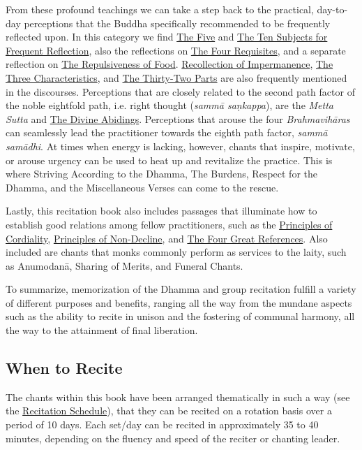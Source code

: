 From these profound teachings we can take a step back to the practical, day-to-day perceptions that the Buddha specifically recommended to be frequently reflected upon. In this category we find \hyperref[five-reflections]{The Five} and \hyperref[ten-reflections]{The Ten Subjects for Frequent Reflection}, also the reflections on \hyperref[four-requisites]{The Four Requisites}, and a separate reflection on \hyperref[repulsiveness-of-food]{The Repulsiveness of Food}. \hyperref[recollection-of-impermanence]{Recollection of Impermanence}, \hyperref[three-characteristics]{The Three Characteristics}, and \hyperref[32-parts]{The Thirty-Two Parts} are also frequently mentioned in the discourses. Perceptions that are closely related to the second path factor of the noble eightfold path, i.e. right thought (\textit{sammā saṇkappa}), are the \textit{Metta Sutta} and \hyperref[divine-abidings]{The Divine Abidings}. Perceptions that arouse the four \textit{Brahmavihāras} can seamlessly lead the practitioner towards the eighth path factor, \textit{sammā samādhi}. At times when energy is lacking, however, chants that inspire, motivate, or arouse urgency can be used to heat up and revitalize the practice. This is where Striving According to the Dhamma, The Burdens, Respect for the Dhamma, and the Miscellaneous Verses can come to the rescue.

Lastly, this recitation book also includes passages that illuminate how to establish good relations among fellow practitioners, such as the \hyperref[principles-of-cordiality]{Principles of Cordiality}, \hyperref[principles-of-non-decline]{Principles of Non-Decline}, and \hyperref[four-great-references]{The Four Great References}. Also included are chants that monks commonly perform as services to the laity, such as Anumodanā, Sharing of Merits, and Funeral Chants.

To summarize, memorization of the Dhamma and group recitation fulfill a variety of different purposes and benefits, ranging all the way from the mundane aspects such as the ability to recite in unison and the fostering of communal harmony, all the way to the attainment of final liberation.

\subsection*{When to Recite}

The chants within this book have been arranged thematically in such a way (see the \hyperref[schedule]{Recitation Schedule}), that they can be recited on a rotation basis over a period of 10 days. Each set/day can be recited in approximately 35 to 40 minutes, depending on the fluency and speed of the reciter or chanting leader.

